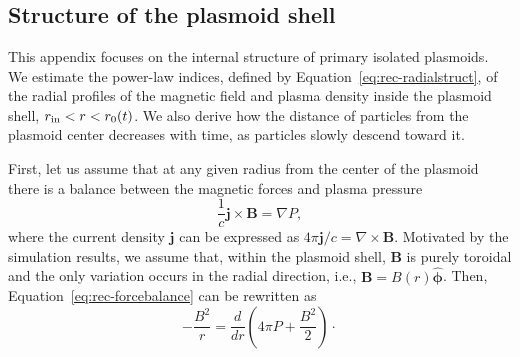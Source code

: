 \chapter{}
\section{Structure of the plasmoid shell}
\label{appendix:rec-plasmashell}

This appendix focuses on the internal structure of primary isolated plasmoids. We estimate the power-law indices, defined by Equation~\eqref{eq:rec-radialstruct}, of the radial profiles of the magnetic field and plasma density inside the plasmoid shell, $r_{\rm in} < r < r_0(t)$. We also derive how the distance of particles from the plasmoid center decreases with time, as particles slowly descend toward it.

First, let us assume that at any given radius from the center of the plasmoid there is a balance between the magnetic forces and plasma pressure
\begin{equation}
    \label{eq:rec-forcebalance}
    \frac{1}{c}\bm{j}\times\bm{B} = \nabla P,
\end{equation}
where the current density $\bm{j}$ can be expressed as $4\pi\bm{j}/c=\nabla\times\bm{B}$. Motivated by the simulation results, we assume that, within the plasmoid shell, $\bm{B}$ is purely toroidal and the only variation occurs in the radial direction, i.e., $\bm{B}=B(r)\bm{\hat{\phi}}$. Then, Equation~\eqref{eq:rec-forcebalance} can be rewritten as
\begin{equation}
    \label{eq:rec-b1}
    -\frac{B^2}{r} = \frac{d}{dr}\left(4\pi P + \frac{B^2}{2}\right) \cdot
\end{equation}

